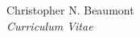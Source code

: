 \documentclass[10pt]{article}
\newenvironment{sublist}{%
	\begin{list}{}{%
		\setlength{\itemsep}{0em}\setlength{\parsep}{0em}%
		\setlength{\topsep}{0em}\setlength{\parskip}{0em}%
	}%
}%
{ \end{list} }
\begin{document}
\begin{cv}{Christopher N. Beaumont\\{\large \itshape Curriculum Vitae}}
\setlength{\oldcvlabelwidth}{\cvlabelwidth}
\setlength{\cvlabelwidth}{1em}
\begin{comment}
\begin{cvlist}{Technical Skills}
	\item \textbf{Proficient}
	\begin{sublist}
		\item Python, IDL 
	\end{sublist}
	\item \textbf{Familiar} 
	\begin{sublist}
		\item Mathematica, C, Java, Python, PHP, Perl
	\end{sublist}
\end{cvlist}
\setlength{\cvlabelwidth}{\oldcvlabelwidth}
\end{comment}

\end{cv}
\end{document}
